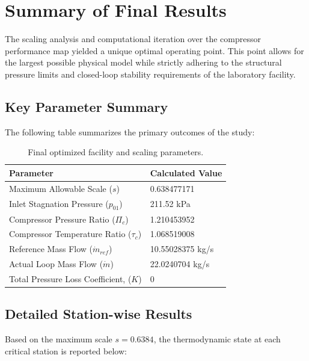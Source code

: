 \documentclass[12pt]{article}
\begin{document}
\section{Summary of Final Results}

The scaling analysis and computational iteration over the compressor performance map yielded a unique optimal operating point. This point allows for the largest possible physical model while strictly adhering to the structural pressure limits and closed-loop stability requirements of the laboratory facility.

\subsection{Key Parameter Summary}
The following table summarizes the primary outcomes of the study:

\begin{table}[h!]
\centering
\renewcommand{\arraystretch}{1.5}
\begin{tabular}{|l|l|}
\hline
\textbf{Parameter} & \textbf{Calculated Value} \\ \hline
Maximum Allowable Scale ($s$) &{0.638477171} \\ \hline
Inlet Stagnation Pressure ($p_{01}$) & {211.52 kPa} \\ \hline
Compressor Pressure Ratio ($\Pi_c$) & {1.210453952
} \\ \hline
Compressor Temperature Ratio ($\tau_c$) & {1.068519008} \\ \hline
Reference Mass Flow ($\dot{m}_{ref}$) & {10.55028375
 kg/s} \\ \hline
Actual Loop Mass Flow ($\dot{m}$) & {22.0240704 kg/s} \\ \hline
Total Pressure Loss Coefficient, ($K$) & {0} \\ \hline
\end{tabular}
\caption{Final optimized facility and scaling parameters.}
\end{table}

\subsection{Detailed Station-wise Results}
Based on the maximum scale $s = 0.6384$, the thermodynamic state at each critical station is reported below:
\end{document}
